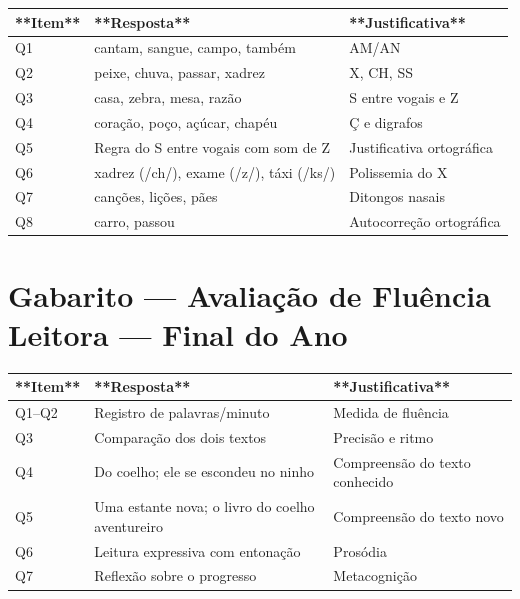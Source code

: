 \begin{center}
\renewcommand{\arraystretch}{1.5}
\begin{tabular}{lll}
\toprule
**Item** & **Resposta** & **Justificativa** \\
\midrule

Q1 & cantam, sangue, campo, também & AM/AN \\

Q2 & peixe, chuva, passar, xadrez & X, CH, SS \\

Q3 & casa, zebra, mesa, razão & S entre vogais e Z \\

Q4 & coração, poço, açúcar, chapéu & Ç e digrafos \\

Q5 & Regra do S entre vogais com som de Z & Justificativa ortográfica \\

Q6 & xadrez (/ch/), exame (/z/), táxi (/ks/) & Polissemia do X \\

Q7 & canções, lições, pães & Ditongos nasais \\

Q8 & carro, passou & Autocorreção ortográfica \\

\bottomrule
\end{tabular}
\end{center}

\section{Gabarito --- Avaliação de Fluência Leitora — Final do Ano}

\begin{center}
\renewcommand{\arraystretch}{1.5}
\begin{tabular}{lll}
\toprule
**Item** & **Resposta** & **Justificativa** \\
\midrule

Q1–Q2 & Registro de palavras/minuto & Medida de fluência \\

Q3 & Comparação dos dois textos & Precisão e ritmo \\

Q4 & Do coelho; ele se escondeu no ninho & Compreensão do texto conhecido \\

Q5 & Uma estante nova; o livro do coelho aventureiro & Compreensão do texto novo \\

Q6 & Leitura expressiva com entonação & Prosódia \\

Q7 & Reflexão sobre o progresso & Metacognição \\

\bottomrule
\end{tabular}
\end{center}

